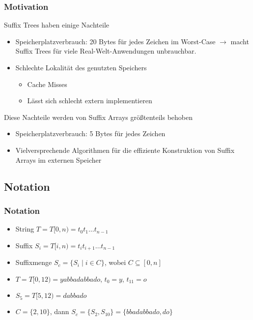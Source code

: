 \documentclass{beamer}
\begin{document}
\begin{frame}[fragile]
\frametitle{Motivation}
Suffix Trees haben einige Nachteile
\begin{itemize}
    \item Speicherplatzverbrauch: 20 Bytes für jedes Zeichen im Worst-Case $\rightarrow$ macht Suffix Trees für viele Real-Welt-Anwendungen unbrauchbar.
    \item Schlechte Lokalität des genutzten Speichers
        \begin{itemize}
            \item Cache Misses
            \item Lässt sich schlecht extern implementieren
        \end{itemize}
\end{itemize}
\vspace{5mm}
Diese Nachteile werden von Suffix Arrays größtenteils behoben
\begin{itemize}
    \item Speicherplatzverbrauch: 5 Bytes für jedes Zeichen
    \item Vielversprechende Algorithmen für die effiziente Konstruktion von Suffix Arrays im externen Speicher
\end{itemize}
\end{frame}

\subsection{Notation}

\begin{frame}[fragile]
\frametitle{Notation}
\begin{itemize}
    \item String $T = T[0,n) = t_0t_1 \dots t_{n-1}$
    \item Suffix $S_i = T[i,n) = t_it_{i+1} \dots t_{n-1}$
    \item Suffixmenge $S_c = \{ S_i \mid i \in C\}$, wobei $C \subseteq [0,n]$
\end{itemize}
\begin{example}
\begin{itemize}
    \item $T = T[0,12) = yabbadabbado$, $t_0 = y$, $t_{11} = o$
    \item $S_5 = T[5,12) = dabbado$
    \item $C = \{2,10\}$, dann $S_c = \{ S_2, S_{10}\} = \{bbadabbado, do\}$
\end{itemize}
\end{example}
\end{frame}
\end{document}
